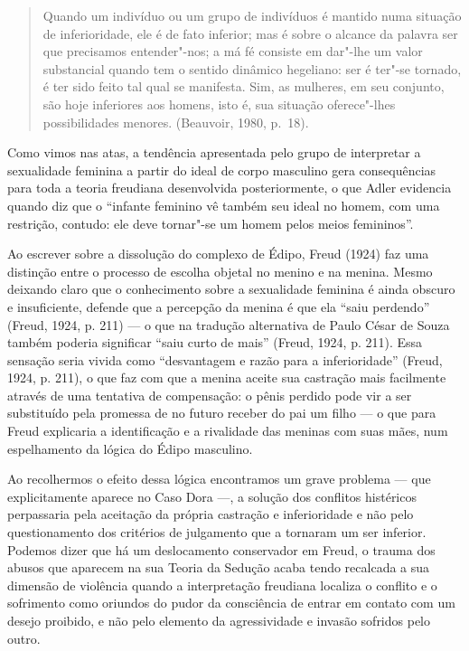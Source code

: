 \begin{quote}
Quando um indivíduo ou um grupo de indivíduos é mantido numa situação de
inferioridade, ele é de fato inferior; mas é sobre o alcance da palavra
ser que precisamos entender"-nos; a má fé consiste em dar"-lhe um valor
substancial quando tem o sentido dinâmico hegeliano: ser é ter"-se
tornado, é ter sido feito tal qual se manifesta. Sim, as mulheres, em
seu conjunto, são hoje inferiores aos homens, isto é, sua situação
oferece"-lhes possibilidades menores. (Beauvoir, 1980, p.~18).
\end{quote}

Como vimos nas atas, a tendência apresentada pelo grupo de interpretar a
sexualidade feminina a partir do ideal de corpo masculino gera
consequências para toda a teoria freudiana desenvolvida posteriormente,
o que Adler evidencia quando diz que o ``infante feminino vê também seu
ideal no homem, com uma restrição, contudo: ele deve tornar"-se um homem
pelos meios femininos''.

Ao escrever sobre a dissolução do complexo de Édipo, Freud (1924) faz
uma distinção entre o processo de escolha objetal no menino e na menina.
Mesmo deixando claro que o conhecimento sobre a sexualidade feminina é
ainda obscuro e insuficiente, defende que a percepção da menina é que
ela ``saiu perdendo'' (Freud, 1924, p. 211) --- o que na tradução
alternativa de Paulo César de Souza também poderia significar ``saiu
curto de mais'' (Freud, 1924, p. 211). Essa sensação seria vivida como
``desvantagem e razão para a inferioridade'' (Freud, 1924, p. 211), o que
faz com que a menina aceite sua castração mais facilmente através de uma
tentativa de compensação: o pênis perdido pode vir a ser substituído
pela promessa de no futuro receber do pai um filho --- o que para Freud
explicaria a identificação e a rivalidade das meninas com suas mães, num
espelhamento da lógica do Édipo masculino.

Ao recolhermos o efeito dessa lógica encontramos um grave problema ---
que explicitamente aparece no Caso Dora ---, a solução dos conflitos
histéricos perpassaria pela aceitação da própria castração e
inferioridade e não pelo questionamento dos critérios de julgamento que
a tornaram um ser inferior. Podemos dizer que há um deslocamento
conservador em Freud, o trauma dos abusos que aparecem na sua Teoria da
Sedução acaba tendo recalcada a sua dimensão de violência quando a
interpretação freudiana localiza o conflito e o sofrimento como oriundos
do pudor da consciência de entrar em contato com um desejo proibido, e
não pelo elemento da agressividade e invasão sofridos pelo outro.


